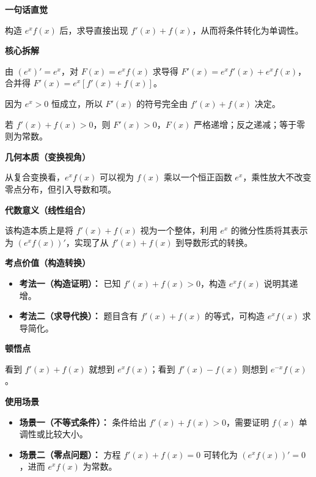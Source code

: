 \begin{explanationbox}
	\textbf{\textcolor{CExplanation}{一句话直觉}}

	构造 $e^x f(x)$ 后，求导直接出现 $f'(x)+f(x)$，从而将条件转化为单调性。

	\medskip
	\textbf{\textcolor{CExplanation}{核心拆解}}
	\begin{description}[style=nextline, leftmargin=2.8em, labelsep=0.5em, itemsep=0.45em]
		\item[\textbf{要点一（乘积求导）：}] 由 $(e^x)'=e^x$，对 $F(x)=e^x f(x)$ 求导得 $F'(x)=e^x f'(x)+e^x f(x)$，合并得 $F'(x)=e^x[f'(x)+f(x)]$。
		\item[\textbf{要点二（符号判据）：}] 因为 $e^x>0$ 恒成立，所以 $F'(x)$ 的符号完全由 $f'(x)+f(x)$ 决定。
		\item[\textbf{要点三（等价转化）：}] 若 $f'(x)+f(x)>0$，则 $F'(x)>0$，$F(x)$ 严格递增；反之递减；等于零则为常数。
	\end{description}

	\medskip
	\textbf{\textcolor{CExplanation}{几何本质（变换视角）}}

	从复合变换看，$e^x f(x)$ 可以视为 $f(x)$ 乘以一个恒正函数 $e^x$，乘性放大不改变零点分布，但引入导数和项。

	\medskip
	\textbf{\textcolor{CExplanation}{代数意义（线性组合）}}

	该构造本质上是将 $f'(x)+f(x)$ 视为一个整体，利用 $e^x$ 的微分性质将其表示为 $(e^x f(x))'$，实现了从 $f'(x)+f(x)$ 到导数形式的转换。

	\medskip
	\textbf{\textcolor{CExplanation}{考点价值（构造转换）}}
	\begin{itemize}[leftmargin=*, itemsep=0.5em, topsep=0.4em]
		\item \textbf{考法一（构造证明）：} 已知 $f'(x)+f(x)>0$，构造 $e^x f(x)$ 说明其递增。
		\item \textbf{考法二（求导代换）：} 题目含有 $f'(x)+f(x)$ 的等式，可构造 $e^x f(x)$ 求导简化。
	\end{itemize}

	\medskip
	\textbf{\textcolor{CExplanation}{顿悟点}}

	看到 $f'(x)+f(x)$ 就想到 $e^x f(x)$；看到 $f'(x)-f(x)$ 则想到 $e^{-x}f(x)$。

	\medskip
	\textbf{\textcolor{CExplanation}{使用场景}}
	\begin{itemize}[leftmargin=*, itemsep=0.5em, topsep=0.4em]
		\item \textbf{场景一（不等式条件）：} 条件给出 $f'(x)+f(x) > 0$，需要证明 $f(x)$ 单调性或比较大小。
		\item \textbf{场景二（零点问题）：} 方程 $f'(x)+f(x)=0$ 可转化为 $(e^x f(x))'=0$，进而 $e^x f(x)$ 为常数。
	\end{itemize}
\end{explanationbox}
